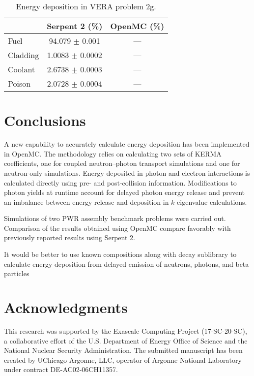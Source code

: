 \documentclass{anstrans}
\begin{document}
\begin{table}[htbp]
  \centering
  \caption{Energy deposition in VERA problem 2g.}
  \label{tab:vera2g}
  \begin{tabular}{lcc}
    \toprule
    & Serpent 2 (\%) & OpenMC (\%) \\
    \midrule
    Fuel & 94.079 $\pm$ 0.001 & --- \\
    Cladding & 1.0083 $\pm$ 0.0002 & --- \\
    Coolant & 2.6738 $\pm$ 0.0003 & --- \\
    Poison & 2.0728 $\pm$ 0.0004 & --- \\
    \bottomrule
  \end{tabular}
\end{table}


\section{Conclusions}

A new capability to accurately calculate energy deposition has been implemented
in OpenMC. The methodology relies on calculating two sets of KERMA coefficients,
one for coupled neutron--photon transport simulations and one for neutron-only
simulations. Energy deposited in photon and electron interactions is calculated
directly using pre- and post-collision information. Modifications to photon
yields at runtime account for delayed photon energy release and prevent an
imbalance between energy release and deposition in $k$-eigenvalue calculations.

Simulations of two PWR assembly benchmark problems were carried out. Comparison
of the results obtained using OpenMC compare favorably with previously reported
results using Serpent 2.

It would be better to use known compositions along with decay sublibrary to
calculate energy deposition from delayed emission of neutrons, photons, and beta
particles

\section{Acknowledgments}

This research was supported by the Exascale Computing Project (17-SC-20-SC), a
collaborative effort of the U.S. Department of Energy Office of Science and the
National Nuclear Security Administration. The submitted manuscript has been
created by UChicago Argonne, LLC, operator of Argonne National Laboratory under
contract DE-AC02-06CH11357.



\end{document}
